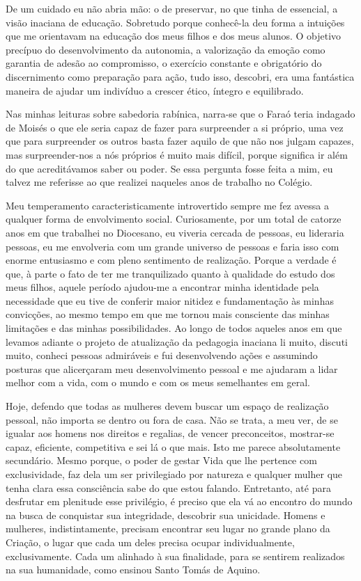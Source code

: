 De um cuidado eu não abria mão: o de preservar, no que tinha de essencial, a visão inaciana de educação.
Sobretudo porque conhecê-la deu forma a intuições que me orientavam na educação dos meus filhos e dos meus alunos.
O objetivo precípuo do desenvolvimento da autonomia, a valorização da emoção como garantia de adesão ao compromisso, o exercício constante e obrigatório do discernimento como preparação para ação, tudo isso, descobri, era uma fantástica maneira de ajudar um indivíduo a crescer ético, íntegro e equilibrado.

Nas minhas leituras sobre sabedoria rabínica, narra-se que o Faraó teria indagado de Moisés o que ele seria capaz de fazer para surpreender a si próprio, uma vez que para surpreender os outros basta fazer aquilo de que não nos julgam capazes, mas surpreender-nos a nós próprios é muito mais difícil, porque significa ir além do que acreditávamos saber ou poder.
Se essa pergunta fosse feita a mim, eu talvez me referisse ao que realizei naqueles anos de trabalho no Colégio.

Meu temperamento caracteristicamente introvertido sempre me fez avessa a qualquer forma de envolvimento social.
Curiosamente, por um total de catorze anos em que trabalhei no Diocesano, eu viveria cercada de pessoas, eu lideraria pessoas, eu me envolveria com um grande universo de pessoas e faria isso com enorme entusiasmo e com pleno sentimento de realização.
Porque a verdade é que, à parte o fato de ter me tranquilizado quanto à qualidade do estudo dos meus filhos, aquele período ajudou-me a encontrar minha identidade pela necessidade que eu tive de conferir maior nitidez e fundamentação às minhas convicções, ao mesmo tempo em que me tornou mais consciente das minhas limitações e das minhas possibilidades.
Ao longo de todos aqueles anos em que levamos adiante o projeto de atualização da pedagogia inaciana li muito, discuti muito, conheci pessoas admiráveis e fui desenvolvendo ações e assumindo posturas que alicerçaram meu desenvolvimento pessoal e me ajudaram a lidar melhor com a vida, com o mundo e com os meus semelhantes em geral.

Hoje, defendo que todas as mulheres devem buscar um espaço de realização pessoal, não importa se dentro ou fora de casa.
Não se trata, a meu ver, de se igualar aos homens nos direitos e regalias, de vencer preconceitos, mostrar-se capaz, eficiente, competitiva e sei lá o que mais.
Isto me parece absolutamente secundário.
Mesmo porque, o poder de gestar Vida que lhe pertence com exclusividade, faz dela um ser privilegiado por natureza e qualquer mulher que tenha clara essa consciência sabe do que estou falando.
Entretanto, até para desfrutar em plenitude esse privilégio, é preciso que ela vá ao encontro do mundo na busca de conquistar sua integridade, descobrir sua unicidade.
Homens e mulheres, indistintamente, precisam encontrar seu lugar no grande plano da Criação, o lugar que cada um deles precisa ocupar individualmente, exclusivamente.
Cada um alinhado à sua finalidade, para se sentirem realizados na sua humanidade, como ensinou Santo Tomás de Aquino.

